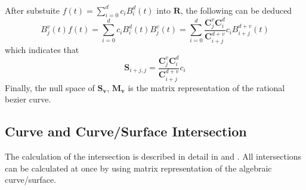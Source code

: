     \paragraph{}
After substuite $f(t) = \sum_{i=0}^dc_iB_i^d(t)$ into $\mathbf{R}$, the following can be deduced
    \begin{equation}
        B_j^v(t)f(t) =  \sum_{i=0}^dc_iB_i^d(t)B_j^v(t) =\sum_{i=0}^d \frac{\mathbf{C}^v_j\mathbf{C}^d_i}{\mathbf{C}^{d+v}_{i+j}}c_i B_{i+j}^{d+v}(t)
    \end{equation}
which indicates that
    \begin{equation}
        \mathbf{S}_{i+j,j} = \frac{\mathbf{C}^v_j\mathbf{C}^d_i}{\mathbf{C}^{d+v}_{i+j}}c_i
    \end{equation}
Finally, the null space of $\mathbf{S_v}$, $\mathbf{M_v}$ is the matrix representation of the rational bezier curve.
\pagebreak


\subsection{Curve and Curve/Surface Intersection}
The calculation of the intersection is described in detail in \cite{Buse2010} and \cite{Ba2009}. All intersections can be calculated at once by using matrix representation of the algebraic curve/surface.
